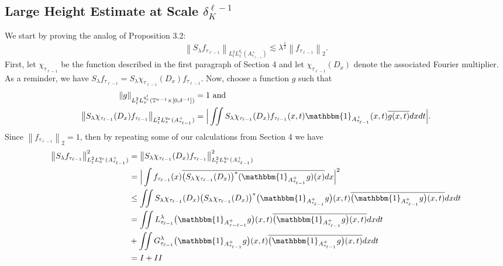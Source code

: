 \documentclass[11pt]{amsart}
\numberwithin{equation}{section}
\newcommand{\Tn}{\mathbb{T}^{n-1}}
\newcommand{\la}{\lambda}
\newcommand\norm[1]{\left\lVert#1\right\rVert}
\newcommand{\altlpnorm}[2]{\norm{#1}_{#2}}
\newcommand{\mixlpnorm}[4]{\norm{#1}_{L^{#2}_{t} L^{#3}_{x}(#4)}}
\newcommand{\Sl}{S_{\la}}
\newcommand{\dK}[1]{\delta_{K}^{#1}}
\begin{document}
\subsection{Large Height Estimate at Scale $\dK{\ell-1}$}
We start by proving the analog of Proposition 3.2:
\begin{equation} \label{large height endpoint estimate}
    \mixlpnorm{\Sl f_{\tau_{\ell - 1}}}{2}{q_e}{A^{+}_{\tau_{\ell - 1}}} \lesssim \la^{\frac{1}{2}}\altlpnorm{f_{\tau_{\ell - 1}}}{2}.
\end{equation}
First, let $\chi_{\tau_{\ell - 1}}$ be the function described in the first paragraph of Section 4 and let $\chi_{\tau_{\ell - 1}}(D_x)$ denote the associated Fourier multiplier. As a  reminder, we have $\Sl f_{\tau_{\ell - 1}} = \Sl \chi_{\tau_{\ell - 1}}(D_x) f_{\tau_{\ell - 1}}$. Now, choose a function $g$ such that
\begin{equation} \label{endpoint large height duality function}
\begin{split}
        \mixlpnorm{g}{2}{q_e'}{\Tn \times [0, \delta^{-1}]} &= 1 \ \text{and} \\
        \mixlpnorm{\Sl \chi_{\tau_{\ell - 1}}(D_x)f_{\tau_{\ell - 1}}}{2}{q_e}{A^{+}_{\tau_{\ell - 1}}} &= \Big|\iint \Sl \chi_{\tau_{\ell - 1}}(D_x) f_{\tau_{\ell - 1}}(x,t)\mathbbm{1}_{A^{+}_{\tau_{\ell - 1}}}(x,t)\overline{ g(x,t)} dx dt\Big|.
\end{split}
\end{equation}
Since $\altlpnorm{f_{\tau_{\ell - 1}}}{2} = 1$, then by repeating some of our calculations from Section 4 we have
\begin{equation}
\begin{split}
\mixlpnorm{\Sl  f_{\tau_{\ell - 1}}}{2}{q_e}{A^{+}_{\tau_{\ell - 1}}}^2 &= \mixlpnorm{\Sl \chi_{\tau_{\ell - 1}}(D_x) f_{\tau_{\ell - 1}}}{2}{q_e}{A^{+}_{\tau_{\ell - 1}}}^2 \\
    &= \Big|\int f_{\tau_{\ell - 1}}(x)\overline{\big(\Sl \chi_{\tau_{\ell - 1}}(D_x)\big)^* (\mathbbm{1}_{A^{+}_{\tau_{\ell - 1}}}g)(x)} dx \Big|^2 \\
     &\leq \iint \Sl \chi_{\tau_{\ell -1}}(D_x) \big( \Sl \chi_{\tau_{\ell - 1}}(D_x)\big)^*\big( \mathbbm{1}_{A^{+}_{\tau_{\ell - 1}}}g\big)(x,t) \overline{\big( \mathbbm{1}_{A^{+}_{\tau_{\ell - 1}}}g\big)(x,t)}dxdt \\
    &=\iint L_{\tau_{\ell - 1}}^{\la}\big( \mathbbm{1}_{A^{+}_{\tau-{\ell - 1}}}g\big)(x,t) \overline{\big( \mathbbm{1}_{A^{+}_{\tau_{\ell - 1}}}g\big)(x,t)}dxdt \\ 
    &+ \iint G_{\tau_{\ell - 1}}^{\la}\big( \mathbbm{1}_{A^{+}_{\tau_{\ell - 1}}}g\big)(x,t) \overline{\big( \mathbbm{1}_{A^{+}_{\tau_{\ell - 1}}}g\big)(x,t)}dxdt \\ 
    &= I + II
\end{split}
\end{equation}
\end{document}

